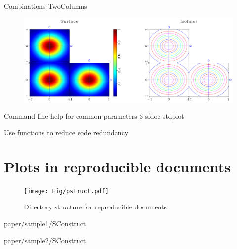 \begin{frame}
  \begin{block}{Combinations}
    TwoColumns \\

     \begin{figure}
     \includegraphics[scale=0.25]{plot/Fig/ganom-6.pdf}
     \end{figure}

  \end{block}
\end{frame}   


\begin{frame}   
  \begin{block}{Command line help for common parameters}
    \$ sfdoc stdplot
  \end{block}
  \begin{block}{Use functions to reduce code redundancy}
   
  \end{block}
\end{frame}

\section{Plots in reproducible documents}

\begin{frame}
  \begin{figure}
  \texttt{[image: Fig/pstruct.pdf]}
  \caption{Directory structure for reproducible documents}
  \end{figure}
\end{frame}

\begin{frame}
  \begin{block}{paper/sample1/SConstruct}
  
  \end{block}
  \begin{block}{paper/sample2/SConstruct}
  
  \end{block}
\end{frame}

